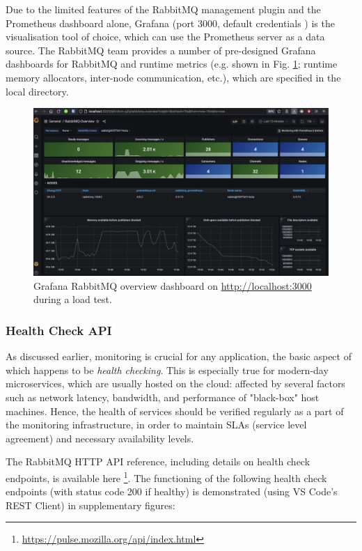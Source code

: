 Due to the limited features of the RabbitMQ management plugin and the Prometheus dashboard alone, Grafana (port 3000, default credentials ) is the visualisation tool of choice, which can use the Prometheus server as a data source. The RabbitMQ team provides a number of pre-designed Grafana dashboards for RabbitMQ and runtime metrics (e.g.  shown in Fig. \ref{fig:grafana-overview}; runtime memory allocators, inter-node communication, etc.), which are specified in the local  directory.

\begin{figure}[H]
  \centering
  \includegraphics[width=1.0\linewidth]{./assets/images/case-studies/grafana-overview.png}
  \caption{Grafana RabbitMQ overview dashboard on \url{http://localhost:3000} during a load test.}
  \label{fig:grafana-overview}
\end{figure}


\subsubsection{Health Check API}

As discussed earlier, monitoring is crucial for any application, the basic aspect of which happens to be \textit{health checking}. This is especially true for modern-day microservices, which are usually hosted on the cloud: affected by several factors such as network latency, bandwidth, and performance of "black-box" host machines. Hence, the health of services should be verified regularly as a part of the monitoring infrastructure, in order to maintain SLAs (service level agreement) and necessary availability levels.

The RabbitMQ HTTP API reference, including details on health check endpoints, is available here \footnote{\url{https://pulse.mozilla.org/api/index.html}}. The functioning of the following health check endpoints (with status code 200 if healthy) is demonstrated (using VS Code's REST Client) in supplementary figures:

